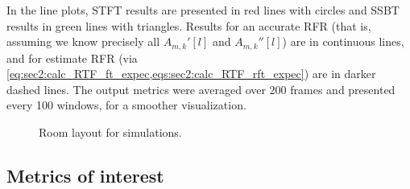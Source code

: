 In the line plots, STFT results are presented in red lines with circles and SSBT results in green lines with triangles. Results for an accurate RFR (that is, assuming we know precisely all $A_{m,k}'[l]$ and $A_{m,k}''[l]$) are in continuous lines, and for estimate RFR (via \cref{eq:sec2:calc_RTF_ft_expec,eqs:sec2:calc_RTF_rft_expec}) are in darker dashed lines. The output metrics were averaged over 200 frames and presented every 100 windows, for a smoother visualization.

\begin{figure}[!ht]
	\centering
	
	\caption{Room layout for simulations.}
	\label{fig:room_layout}
\end{figure}
%

\subsection{Metrics of interest}

